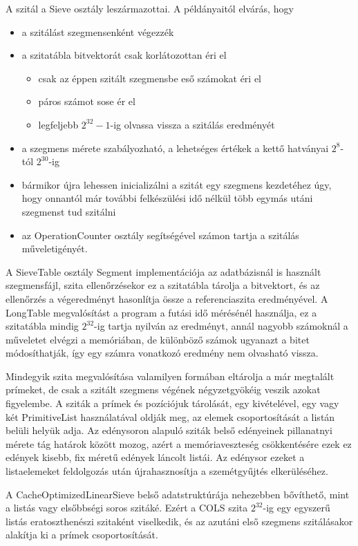 A szitál a Sieve osztály leszármazottai.
A példányaitól elvárás, hogy
\begin{itemize}
\item a szitálást szegmensenként végezzék
\item a szitatábla bitvektorát csak korlátozottan éri el
\begin{itemize}
\item csak az éppen szitált szegmensbe eső számokat éri el
\item páros számot sose ér el
\item legfeljebb $2^{32}-1$-ig olvassa vissza a szitálás eredményét
\end{itemize}
\item a szegmens mérete szabályozható, a lehetséges értékek a kettő hatványai $2^8$-tól $2^{30}$-ig 
\item bármikor újra lehessen inicializálni a szitát egy szegmens kezdetéhez úgy, hogy onnantól már további felkészülési idő nélkül több egymás utáni szegmenst tud szitálni
\item az OperationCounter osztály segítségével számon tartja a szitálás műveletigényét.
\end{itemize}

A SieveTable osztály Segment implementációja az adatbázisnál is használt szegmensfájl, szita ellenőrzésekor ez a szitatábla tárolja a bitvektort, és az ellenőrzés a végeredményt hasonlítja össze a referenciaszita eredményével.
A LongTable megvalósítást a program a futási idő mérésénél használja, ez a szitatábla mindig $2^{32}$-ig tartja nyilván az eredményt, annál nagyobb számoknál a műveletet elvégzi a memóriában, de különböző számok ugyanazt a bitet módosíthatják, így egy számra vonatkozó eredmény nem olvasható vissza.

Mindegyik szita megvalósítása valamilyen formában eltárolja a már megtalált prímeket, de csak a szitált szegmens végének négyzetgyökéig veszik azokat figyelembe.
A sziták a prímek és pozíciójuk tárolását, egy kivételével, egy vagy két PrimitiveList használatával oldják meg, az elemek csoportosítását a listán belüli helyük adja.
Az edénysoron alapuló sziták belső edényeinek pillanatnyi mérete tág határok között mozog, azért a memóriaveszteség csökkentésére ezek ez edények kisebb, fix méretű edények láncolt listái.
Az edénysor ezeket a listaelemeket feldolgozás után újrahasznosítja a szemétgyűjtés elkerüléséhez.

A CacheOptimizedLinearSieve belső adatstruktúrája nehezebben bővíthető, mint a listás vagy elsőbbségi soros szitáké.
Ezért a COLS szita $2^{32}$-ig egy egyszerű listás eratoszthenészi szitaként viselkedik, és az azutáni első szegmens szitálásakor alakítja ki a prímek csoportosítását.

